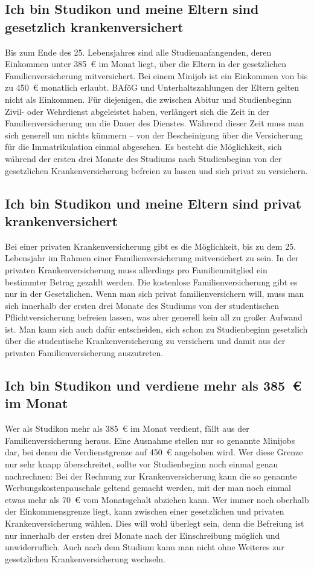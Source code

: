 \subsection*{Ich bin Studikon und meine Eltern sind gesetzlich krankenversichert}

Bis zum Ende des 25. Lebensjahres sind alle Studienanfangenden, 
deren Einkommen unter 385~€ im Monat liegt, über die Eltern in der
gesetzlichen Familienversicherung mitversichert.
Bei einem Minijob ist ein Einkommen von bis zu 450~€ monatlich erlaubt. BAföG und Unterhaltszahlungen
der Eltern gelten nicht als Einkommen. Für diejenigen, die
zwischen Abitur und Studienbeginn Zivil- oder Wehrdienst abgeleistet
haben, verlängert sich die Zeit in der Familienversicherung um die
Dauer des Dienstes. Während dieser Zeit muss man sich generell um
nichts kümmern – von der Bescheinigung über die Versicherung für die
Immatrikulation einmal abgesehen. Es besteht die Möglichkeit, sich
während der ersten drei Monate des Studiums nach Studienbeginn von der
gesetzlichen Krankenversicherung befreien zu lassen und sich privat zu
versichern.

\subsection*{Ich bin Studikon und meine Eltern sind privat krankenversichert}

Bei einer privaten Krankenversicherung gibt es die Möglichkeit, bis zu
dem 25. Lebensjahr im Rahmen einer Familienversicherung
mitversichert zu sein. In der privaten Krankenversicherung muss
allerdings pro Familienmitglied ein bestimmter Betrag gezahlt
werden. Die kostenlose Familienversicherung gibt es nur in der
Gesetzlichen. Wenn man sich privat familienversichern will, muss man
sich innerhalb der ersten drei Monate des Studiums von der
studentischen Pflichtversicherung befreien lassen, was aber generell
kein all zu großer Aufwand ist. Man kann sich auch dafür entscheiden,
sich schon zu Studienbeginn gesetzlich über die studentische
Krankenversicherung zu versichern und damit aus der privaten
Familienversicherung auszutreten.

\subsection*{Ich bin Studikon und verdiene mehr als 385~€ im Monat}

Wer als Studikon mehr als 385~€ im Monat verdient, fällt aus der
Familienversicherung heraus. Eine Ausnahme stellen nur so genannte
Minijobs dar, bei denen die Verdienstgrenze auf 450~€ angehoben
wird. Wer diese Grenze nur sehr knapp überschreitet, sollte vor
Studienbeginn noch einmal genau nachrechnen: Bei der Rechnung zur
Krankenversicherung kann die so genannte Werbungskostenpauschale
geltend gemacht werden, mit der man noch einmal etwas mehr als 70~€
vom Monatsgehalt abziehen kann. Wer immer noch oberhalb der
Einkommensgrenze liegt, kann zwischen einer gesetzlichen und privaten
Krankenversicherung wählen. Dies will wohl überlegt sein, denn die Befreiung
ist nur innerhalb der ersten drei Monate nach der Einschreibung möglich und
unwiderruflich. Auch nach dem Studium kann man nicht ohne Weiteres zur gesetzlichen
Krankenversicherung wechseln.

